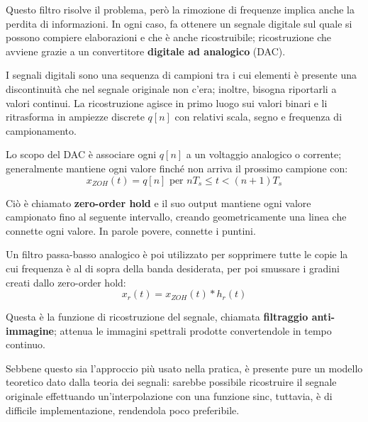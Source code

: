 \noindent Questo filtro risolve il problema, però la rimozione di frequenze implica anche la perdita di informazioni. In ogni caso, fa ottenere un
segnale digitale sul quale si possono compiere elaborazioni e che è anche ricostruibile; ricostruzione che avviene grazie a un convertitore
\textbf{digitale ad analogico} (DAC).\par
I segnali digitali sono una sequenza di campioni tra i cui elementi è presente una discontinuità che nel segnale originale non c'era; inoltre, bisogna
riportarli a valori continui. La ricostruzione agisce in primo luogo sui valori binari e li ritrasforma in ampiezze discrete $q[n]$ con relativi scala,
segno e frequenza di campionamento.\par
Lo scopo del DAC è associare ogni $q[n]$ a un voltaggio analogico o corrente; generalmente mantiene ogni valore finché non arriva il prossimo campione
con: \[
	x_{ZOH}(t) = q[n] \text{ per } nT_s \leq t < (n+1)T_s
\]

\noindent Ciò è chiamato \textbf{zero-order hold} e il suo output mantiene ogni valore campionato fino al seguente intervallo, creando geometricamente 
una linea che connette ogni valore. In parole povere, connette i puntini.\par
Un filtro passa-basso analogico è poi utilizzato per sopprimere tutte le copie la cui frequenza è al di sopra della banda desiderata, per poi smussare i
gradini creati dallo zero-order hold: \[
	x_r(t) = x_{ZOH}(t) * h_r(t)
\]

\noindent Questa è la funzione di ricostruzione del segnale, chiamata \textbf{filtraggio anti-immagine}; attenua le immagini spettrali prodotte
convertendole in tempo continuo.\par
Sebbene questo sia l'approccio più usato nella pratica, è presente pure un modello teoretico dato dalla teoria dei segnali: sarebbe possibile
ricostruire il segnale originale effettuando un'interpolazione con una funzione sinc, tuttavia, è di difficile implementazione, rendendola poco
preferibile.
